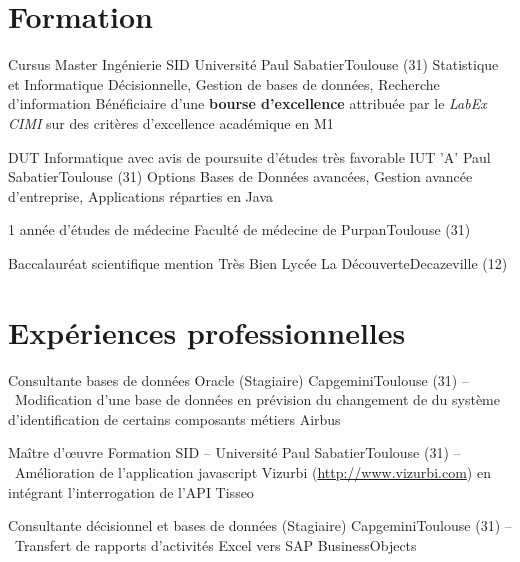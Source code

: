 \documentclass{my_cv_bis}
\begin{document}
 \vspace{-2mm}
\section{Formation}
	{Cursus Master Ingénierie SID}
	{Université Paul Sabatier}{Toulouse (31)}
	{Statistique et Informatique Décisionnelle, Gestion de bases de données, Recherche d'information}
	{Bénéficiaire d'une \textbf{bourse d'excellence} attribuée par le \textit{LabEx CIMI} sur des critères d’excellence académique en M1}
	
	{DUT Informatique avec avis de poursuite d'études très favorable}
	{IUT 'A' Paul Sabatier}{Toulouse (31)}
	{Options Bases de Données avancées, Gestion avancée d'entreprise, Applications réparties en Java}
	{}
	
	
	{1 année d'études de médecine}
	{Faculté de médecine de Purpan}{Toulouse (31)}
	{}{}
	
	{Baccalauréat scientifique mention Très Bien}
	{Lycée La Découverte}{Decazeville (12)}
	{}{}



\section{Expériences professionnelles}
	{Consultante bases de données Oracle {\small\color{gray} (Stagiaire)}}
	{Capgemini}{Toulouse (31)}
	{\hspace{-1.2mm}\small{--~Modification d'une base de données en prévision du changement de du système d'identification de certains composants métiers Airbus}}{}

	{Maître d'\oe{}uvre}
	{Formation SID -- Université Paul Sabatier}{Toulouse (31)}
	{\hspace{-1.2mm}\small{--~Amélioration de l'application javascript Vizurbi (\href{http://www.vizurbi.com}{http://www.vizurbi.com}) en intégrant l'interrogation de l'API Tisseo}}{}
	
	{Consultante décisionnel et bases de données {\small\color{gray} (Stagiaire)}}
	{Capgemini}{Toulouse (31)}
	{\hspace{-1.2mm}\small{--~Transfert de rapports d'activités Excel vers SAP BusinessObjects}}
	{}
	
\end{document}
